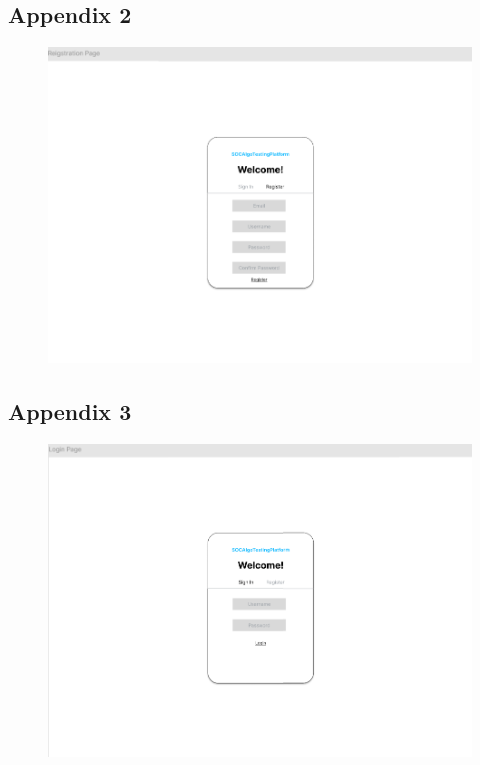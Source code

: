 \documentclass[12pt, titlepage]{article}
\begin{document}
\subsection{Appendix 2} \label{Appendix 2}
\begin{figure}[H]
    \centering
    \includegraphics[width=1\linewidth]{Design/SoftArchitecture/Interface/Registration.png}
\end{figure}
\subsection{Appendix 3} \label{Appendix 3}
\begin{figure}[H]
    \centering
    \includegraphics[width=1\linewidth]{Design/SoftArchitecture/Interface/Login.png}
\end{figure}
\end{document}
